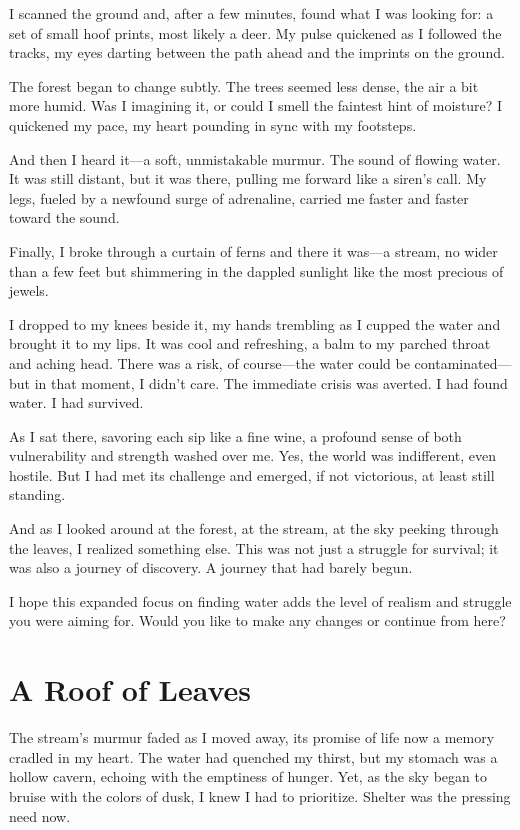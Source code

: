 \documentclass[]{article}
\begin{document}
I scanned the ground and, after a few minutes, found what I was looking for: a set of small hoof prints, most likely a deer. My pulse quickened as I followed the tracks, my eyes darting between the path ahead and the imprints on the ground.

The forest began to change subtly. The trees seemed less dense, the air a bit more humid. Was I imagining it, or could I smell the faintest hint of moisture? I quickened my pace, my heart pounding in sync with my footsteps.

And then I heard it—a soft, unmistakable murmur. The sound of flowing water. It was still distant, but it was there, pulling me forward like a siren's call. My legs, fueled by a newfound surge of adrenaline, carried me faster and faster toward the sound.

Finally, I broke through a curtain of ferns and there it was—a stream, no wider than a few feet but shimmering in the dappled sunlight like the most precious of jewels.

I dropped to my knees beside it, my hands trembling as I cupped the water and brought it to my lips. It was cool and refreshing, a balm to my parched throat and aching head. There was a risk, of course—the water could be contaminated—but in that moment, I didn't care. The immediate crisis was averted. I had found water. I had survived.

As I sat there, savoring each sip like a fine wine, a profound sense of both vulnerability and strength washed over me. Yes, the world was indifferent, even hostile. But I had met its challenge and emerged, if not victorious, at least still standing.

And as I looked around at the forest, at the stream, at the sky peeking through the leaves, I realized something else. This was not just a struggle for survival; it was also a journey of discovery. A journey that had barely begun.

I hope this expanded focus on finding water adds the level of realism and struggle you were aiming for. Would you like to make any changes or continue from here?

\section{A Roof of Leaves}

The stream's murmur faded as I moved away, its promise of life now a memory cradled in my heart. The water had quenched my thirst, but my stomach was a hollow cavern, echoing with the emptiness of hunger. Yet, as the sky began to bruise with the colors of dusk, I knew I had to prioritize. Shelter was the pressing need now.
\end{document}
